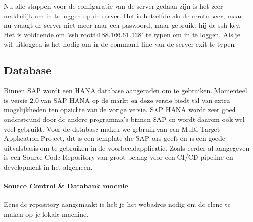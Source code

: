             Nu alle stappen voor de configuratie van de server gedaan zijn is het zeer makkelijk om in te loggen op de server.
            Het is hetzelfde als de eerste keer, maar nu vraagt de server niet meer naar een paswoord, maar gebruikt hij de ssh-key. Het is voldoende om 
            'ssh root@188.166.61.128' te typen om in te loggen.
            Als je wil uitloggen is het nodig om in de command line van de server exit te typen.
    
        \subsection{Database}
        \label{subsec:database}
        Binnen SAP wordt een HANA database aangeraden om te gebruiken. Momenteel is versie 2.0 van SAP HANA op de markt en deze versie biedt tal van extra mogelijkheden ten opzichte van de vorige versie. SAP HANA wordt zeer goed ondersteund door de andere programma's binnen SAP en wordt daarom ook wel veel gebruikt.
        Voor de database maken we gebruik van een Multi-Target Application Project, dit is een template die SAP ons geeft en is een goede uitvalsbasis om te gebruiken in de voorbeeldapplicatie.
        Zoals eerder al aangegeven is een Source Code Repository van groot belang voor een CI/CD pipeline en development in het algemeen.
        
            \paragraph{Source Control \& Databank module}
            Eens de repository aangemaakt is heb je het webadres nodig om de clone te maken op je lokale machine.
            
